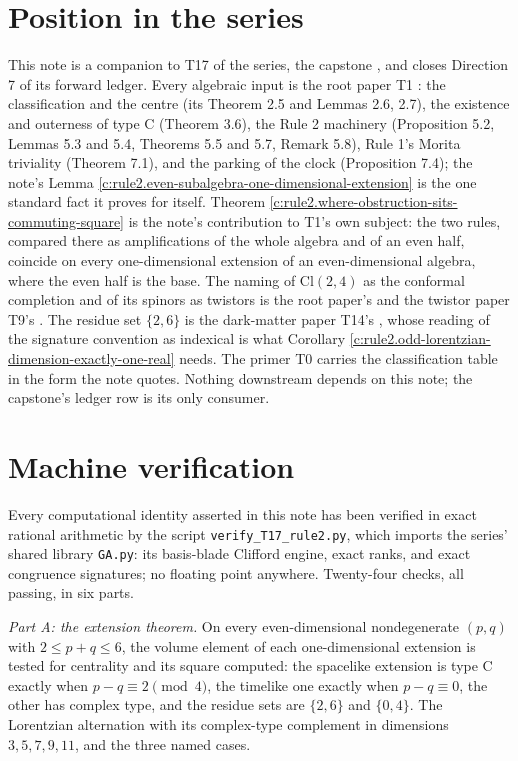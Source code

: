 \documentclass[11pt]{article}
\theoremstyle{definition}
\theoremstyle{plain}
\providecommand{\Cl}{}\renewcommand{\Cl}{\mathrm{Cl}}
\begin{document}
\section{Position in the series}

\label{c:note.rule2.setting-position-series}
This note is a companion to T17 of the series, the capstone \cite{ButlerT17}, and closes Direction 7 of its forward ledger. Every algebraic input is the root paper T1 \cite{ButlerT1}: the classification and the centre (its Theorem 2.5 and Lemmas 2.6, 2.7), the existence and outerness of type C (Theorem 3.6), the Rule 2 machinery (Proposition 5.2, Lemmas 5.3 and 5.4, Theorems 5.5 and 5.7, Remark 5.8), Rule 1's Morita triviality (Theorem 7.1), and the parking of the clock (Proposition 7.4); the note's Lemma \ref{c:rule2.even-subalgebra-one-dimensional-extension} is the one standard fact it proves for itself. Theorem \ref{c:rule2.where-obstruction-sits-commuting-square} is the note's contribution to T1's own subject: the two rules, compared there as amplifications of the whole algebra and of an even half, coincide on every one-dimensional extension of an even-dimensional algebra, where the even half is the base. The naming of $\Cl(2,4)$ as the conformal completion and of its spinors as twistors is the root paper's and the twistor paper T9's \cite{ButlerT9}. The residue set $\{2, 6\}$ is the dark-matter paper T14's \cite{ButlerT14}, whose reading of the signature convention as indexical is what Corollary \ref{c:rule2.odd-lorentzian-dimension-exactly-one-real} needs. The primer T0 \cite{ButlerT0} carries the classification table in the form the note quotes. Nothing downstream depends on this note; the capstone's ledger row is its only consumer.

\section{Machine verification}

\label{c:note.rule2.setting-machine-verification}
Every computational identity asserted in this note has been verified in exact rational arithmetic by the script \texttt{verify\_T17\_rule2.py}, which imports the series' shared library \texttt{GA.py}: its basis-blade Clifford engine, exact ranks, and exact congruence signatures; no floating point anywhere. Twenty-four checks, all passing, in six parts.

\emph{Part A: the extension theorem.} On every even-dimensional nondegenerate $(p,q)$ with $2 \leq p + q \leq 6$, the volume element of each one-dimensional extension is tested for centrality and its square computed: the spacelike extension is type C exactly when $p - q \equiv 2 \pmod 4$, the timelike one exactly when $p - q \equiv 0$, the other has complex type, and the residue sets are $\{2, 6\}$ and $\{0, 4\}$. The Lorentzian alternation with its complex-type complement in dimensions $3, 5, 7, 9, 11$, and the three named cases.
\end{document}

